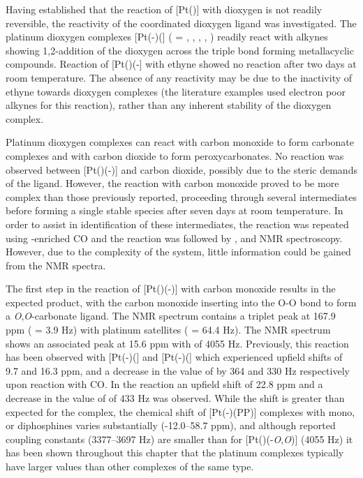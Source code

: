 Having established that the reaction of [Pt(\tButhixantphos)] with dioxygen is not readily reversible, the reactivity of the coordinated dioxygen ligand was investigated.  The platinum dioxygen complexes [Pt(-)(] ( = , , , , ) readily react with alkynes showing 1,2-addition of the dioxygen across the triple bond forming metallacyclic compounds\cite{Clark1978}.  Reaction of [Pt(\tButhixantphos)(-] with ethyne showed no reaction after two days at room temperature.  The absence of any reactivity may be due to the inactivity of ethyne towards dioxygen complexes (the literature examples used electron poor alkynes for this reaction), rather than any inherent stability of the dioxygen complex.

Platinum dioxygen complexes can react with carbon monoxide to form carbonate complexes and with carbon dioxide to form peroxycarbonates.\cite{Goel1983b}  No reaction was observed between [Pt(\tButhixantphos)(-)] and carbon dioxide, possibly due to the steric demands of the \tButhixantphos{} ligand.  However, the reaction with carbon monoxide proved to be more complex than those previously reported, proceeding through several intermediates before forming a single stable species after seven days at room temperature.  In order to assist in identification of these intermediates, the reaction was repeated using \carbon{}-enriched CO and the reaction was followed by \proton{}, \carbon{} and \phosphorus{} NMR spectroscopy.  However, due to the complexity of the system, little information could be gained from the \proton{} NMR spectra.  

The first step in the reaction of [Pt(\tButhixantphos)(-)] with carbon monoxide results in the expected product, with the carbon monoxide inserting into the O-O bond to form a \emph{O},\emph{O}-carbonate ligand.  The \carbon{} NMR spectrum contains a triplet peak at 167.9 ppm (\JPC{} = 3.9 Hz) with platinum satellites (\JPtC{} = 64.4 Hz).  The \phosphorus{} NMR spectrum shows an associated peak at 15.6 ppm with \JPtP{} of 4055 Hz.  Previously, this reaction has been observed with [Pt(-)(] and [Pt(-)(] which experienced upfield shifts of 9.7 and 16.3 ppm, and a decrease in the value of \JPtP{} by 364 and 330 Hz respectively upon reaction with CO.\cite{Goel1983b}  In the \tButhixantphos{} reaction an upfield shift of 22.8 ppm and a decrease in the value of \JPtP{} of 433 Hz was observed.  While the shift is greater than expected for the \tButhixantphos{} complex, the chemical shift of [Pt(-)(PP)] complexes with mono, or diphosphines varies substantially (-12.0--58.7 ppm), and although reported coupling constants (3377--3697 Hz)\cite{Goel1983b, Pregosin2012} are smaller than for [Pt(\tButhixantphos)(-\emph{O},\emph{O})] (4055 Hz) it has been shown throughout this chapter that the \tBuxantphos{} platinum complexes typically have larger \JPtP{} values than other complexes of the same type.

